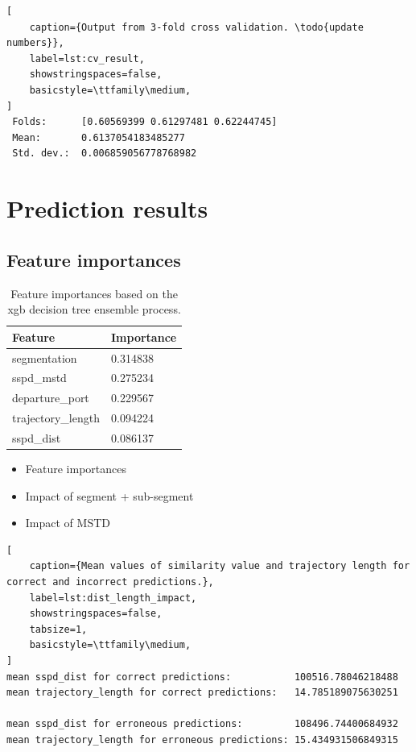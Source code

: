 \begin{lstlisting}[
    caption={Output from 3-fold cross validation. \todo{update numbers}},
    label=lst:cv_result,
    showstringspaces=false,
    basicstyle=\ttfamily\medium,
]
 Folds:      [0.60569399 0.61297481 0.62244745]
 Mean:       0.6137054183485277
 Std. dev.:  0.006859056778768982
\end{lstlisting}

\section{Prediction results}

\subsection{Feature importances}

\begin{table}[htbp]
    \centering
    \begin{tabularx}{0.6\textwidth}{X X}
        \bfseries{Feature}  & \bfseries{Importance} \\ \toprule
        segmentation        & 0.314838 \\ \midrule
        sspd\_mstd          & 0.275234 \\ \midrule
        departure\_port     & 0.229567 \\ \midrule
        trajectory\_length  & 0.094224 \\ \midrule
        sspd\_dist          & 0.086137 \\ \bottomrule
    \end{tabularx}
    \caption{Feature importances based on the \acrshort{xgb} decision tree ensemble process. }\label{tab:feature_importances}
\end{table}


\begin{itemize}
    \item Feature importances
    \item Impact of segment + sub-segment
    \item Impact of MSTD
\end{itemize}

\begin{lstlisting}[
    caption={Mean values of similarity value and trajectory length for correct and incorrect predictions.},
    label=lst:dist_length_impact,
    showstringspaces=false,
    tabsize=1,
    basicstyle=\ttfamily\medium,
]
mean sspd_dist for correct predictions:           100516.78046218488
mean trajectory_length for correct predictions:   14.785189075630251

mean sspd_dist for erroneous predictions:         108496.74400684932
mean trajectory_length for erroneous predictions: 15.434931506849315
\end{lstlisting}

